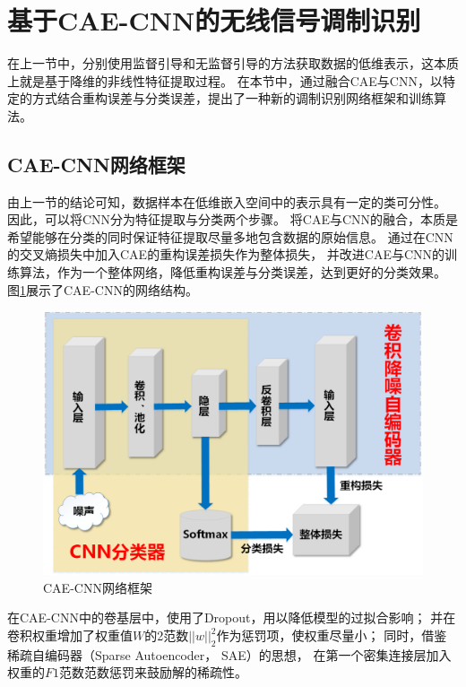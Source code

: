 \section{基于CAE-CNN的无线信号调制识别}

在上一节中，分别使用监督引导和无监督引导的方法获取数据的低维表示，这本质上就是基于降维的非线性特征提取过程。
在本节中，通过融合CAE与CNN，以特定的方式结合重构误差与分类误差，提出了一种新的调制识别网络框架和训练算法。

\subsection{CAE-CNN网络框架}
由上一节的结论可知，数据样本在低维嵌入空间中的表示具有一定的类可分性。
因此，可以将CNN分为特征提取与分类两个步骤。
将CAE与CNN的融合，本质是希望能够在分类的同时保证特征提取尽量多地包含数据的原始信息。
通过在CNN的交叉熵损失中加入CAE的重构误差损失作为整体损失，
并改进CAE与CNN的训练算法，作为一个整体网络，降低重构误差与分类误差，达到更好的分类效果。
图\ref{sec:fig_3_8}展示了CAE-CNN的网络结构。

\begin{figure}[!h]
	\centering
	\includegraphics[scale=0.5]{figures/chapter_3/fig_3_8}
	\caption{CAE-CNN网络框架}	\label{sec:fig_3_8}
\end{figure}

在CAE-CNN中的卷基层中，使用了Dropout，用以降低模型的过拟合影响；
并在卷积权重增加了权重值$W$的2范数$||w||_2^2$作为惩罚项，使权重尽量小；
同时，借鉴稀疏自编码器（Sparse Autoencoder， SAE）的思想，
在第一个密集连接层加入权重的$F1$范数范数惩罚来鼓励解的稀疏性\cite{le2013building}。\par

